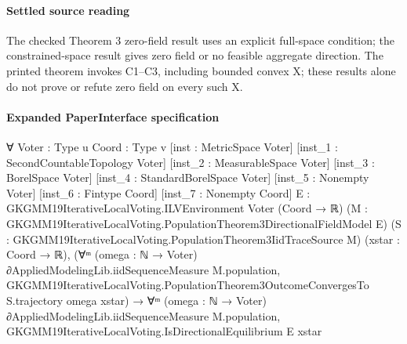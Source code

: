 \documentclass[10pt]{article}
\begin{document}
\paragraph{Settled source reading}
\begin{sloppypar}
The checked Theorem 3 zero-\allowbreak{}field result uses an explicit full-\allowbreak{}space condition;\allowbreak{} the constrained-\allowbreak{}space result gives zero field or no feasible aggregate direction.\allowbreak{} The printed theorem invokes C1–C3, including bounded convex X;\allowbreak{} these results alone do not prove or refute zero field on every such X.\allowbreak{}
\end{sloppypar}

\paragraph{Expanded PaperInterface specification}
\begin{ReviewVerbatim}
∀ {Voter : Type u} {Coord : Type v} [inst : MetricSpace Voter] [inst_1 : SecondCountableTopology Voter]
  [inst_2 : MeasurableSpace Voter] [inst_3 : BorelSpace Voter] [inst_4 : StandardBorelSpace Voter]
  [inst_5 : Nonempty Voter] [inst_6 : Fintype Coord] [inst_7 : Nonempty Coord]
  {E : GKGMM19IterativeLocalVoting.ILVEnvironment Voter (Coord → ℝ)}
  (M : GKGMM19IterativeLocalVoting.PopulationTheorem3DirectionalFieldModel E)
  (S : GKGMM19IterativeLocalVoting.PopulationTheorem3IidTraceSource M) (xstar : Coord → ℝ),
  (∀ᵐ (omega : ℕ → Voter) ∂AppliedModelingLib.iidSequenceMeasure M.population,
      GKGMM19IterativeLocalVoting.PopulationTheorem3OutcomeConvergesTo S.trajectory omega xstar) →
    ∀ᵐ (omega : ℕ → Voter) ∂AppliedModelingLib.iidSequenceMeasure M.population,
      GKGMM19IterativeLocalVoting.IsDirectionalEquilibrium E xstar
\end{ReviewVerbatim}
\end{document}
